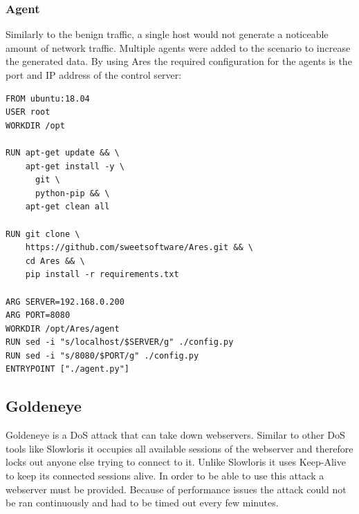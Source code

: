 \documentclass[conference]{IEEEtran}
\begin{document}
\subsubsection{Agent}
Similarly to the benign traffic, a single host would not generate a noticeable amount of network traffic. Multiple agents were added to the scenario to increase the generated data. By using Ares the required configuration for the agents is the port and IP address of the control server:

\begin{lstlisting}[basicstyle=\footnotesize]
FROM ubuntu:18.04
USER root
WORKDIR /opt

RUN apt-get update && \
    apt-get install -y \
      git \
      python-pip && \
    apt-get clean all

RUN git clone \ 
    https://github.com/sweetsoftware/Ares.git && \
    cd Ares && \
    pip install -r requirements.txt

ARG SERVER=192.168.0.200
ARG PORT=8080
WORKDIR /opt/Ares/agent
RUN sed -i "s/localhost/$SERVER/g" ./config.py
RUN sed -i "s/8080/$PORT/g" ./config.py
ENTRYPOINT ["./agent.py"]
\end{lstlisting}

\subsection{Goldeneye}
Goldeneye is a DoS attack that can take down webservers. Similar to other DoS tools like Slowloris it occupies all available sessions of the webserver and therefore locks out anyone else trying to connect to it. Unlike Slowloris it uses Keep-Alive to keep its connected sessions alive. 
In order to be able to use this attack a webserver must be provided. Because of performance issues the attack could not be ran continuously and had to be timed out every few minutes. 
\end{document}
